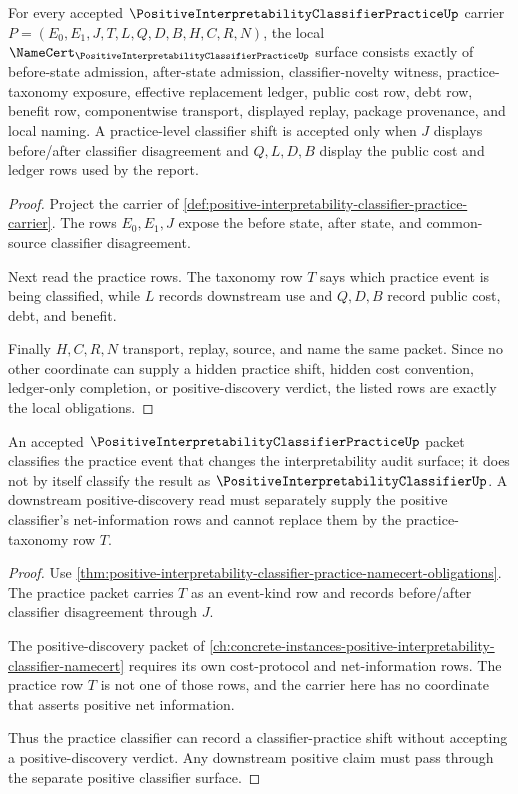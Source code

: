 \begin{theorem}
\label{thm:positive-interpretability-classifier-practice-namecert-obligations}
For every accepted $\PositiveInterpretabilityClassifierPracticeUp$ carrier $P=(E_0,E_1,J,T,L,Q,D,B,H,C,R,N)$, the local $\NameCert_{\PositiveInterpretabilityClassifierPracticeUp}$ surface consists exactly of before-state admission, after-state admission, classifier-novelty witness, practice-taxonomy exposure, effective replacement ledger, public cost row, debt row, benefit row, componentwise transport, displayed replay, package provenance, and local naming. A practice-level classifier shift is accepted only when $J$ displays before/after classifier disagreement and $Q,L,D,B$ display the public cost and ledger rows used by the report.
\end{theorem}
\begin{proof}
Project the carrier of \autoref{def:positive-interpretability-classifier-practice-carrier}. The rows $E_0,E_1,J$ expose the before state, after state, and common-source classifier disagreement.

Next read the practice rows. The taxonomy row $T$ says which practice event is being classified, while $L$ records downstream use and $Q,D,B$ record public cost, debt, and benefit.

Finally $H,C,R,N$ transport, replay, source, and name the same packet. Since no other coordinate can supply a hidden practice shift, hidden cost convention, ledger-only completion, or positive-discovery verdict, the listed rows are exactly the local obligations.
\end{proof}

\begin{theorem}
\label{thm:positive-interpretability-classifier-practice-separation}
An accepted $\PositiveInterpretabilityClassifierPracticeUp$ packet classifies the practice event that changes the interpretability audit surface; it does not by itself classify the result as $\PositiveInterpretabilityClassifierUp$. A downstream positive-discovery read must separately supply the positive classifier's net-information rows and cannot replace them by the practice-taxonomy row $T$.
\end{theorem}
\begin{proof}
Use \autoref{thm:positive-interpretability-classifier-practice-namecert-obligations}. The practice packet carries $T$ as an event-kind row and records before/after classifier disagreement through $J$.

The positive-discovery packet of \autoref{ch:concrete-instances-positive-interpretability-classifier-namecert} requires its own cost-protocol and net-information rows. The practice row $T$ is not one of those rows, and the carrier here has no coordinate that asserts positive net information.

Thus the practice classifier can record a classifier-practice shift without accepting a positive-discovery verdict. Any downstream positive claim must pass through the separate positive classifier surface.
\end{proof}


